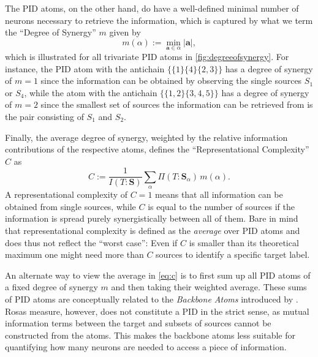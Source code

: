 \documentclass[10pt]{article}
\renewcommand\autoref[1]{\cref{#1}}
\theoremstyle{definition}
\theoremstyle{plain}
\begin{document}
The PID atoms, on the other hand, do have a well-defined minimal number of neurons necessary to retrieve the information, which is captured by what we term the ``Degree of Synergy'' $m$ given by
\begin{equation}
\label{eq:m}
    m(\alpha) := \min_{\bm a \in \alpha} |\bm a|,
\end{equation}
which is illustrated for all trivariate PID atoms in \autoref{fig:degreeofsynergy}.
For instance, the PID atom with the antichain $\{\{1\}\{4\}\{2, 3\}\}$ has a degree of synergy of $m=1$ since the information can be obtained by observing the single sources $S_1$ or $S_4$, while the atom with the antichain $\{\{1, 2\}\{3, 4, 5\}\}$ has a degree of synergy of $m=2$ since the smallest set of sources the information can be retrieved from is the pair consisting of $S_1$ and $S_2$.

Finally, the average degree of synergy, weighted by the relative information contributions of the respective atoms, defines the ``Representational Complexity'' $C$ as
\begin{equation}
    C := \frac{1}{I(T:\bm S)} \sum_\alpha \Pi(T:\bm{S}_\alpha) \, m(\alpha)
    \label{eq:c}.
\end{equation}
A representational complexity of $C=1$ means that all information can be obtained from single sources, while $C$ is equal to the number of sources if the information is spread purely synergistically between all of them. Bare in mind that representational complexity is defined as the \emph{average} over PID atoms and does thus not reflect the ``worst case'': Even if $C$ is smaller than its theoretical maximum one might need more than $C$ sources to identify a specific target label.

An alternate way to view the average in \autoref{eq:c} is to first sum up all PID atoms of a fixed degree of synergy $m$ and then taking their weighted average. These sums of PID atoms are conceptually related to the \textit{Backbone Atoms} introduced by \cite{rosas_operational_2020}. Rosas measure, however, does not constitute a PID in the strict sense, as mutual information terms between the target and subsets of sources cannot be constructed from the atoms. This makes the backbone atoms less suitable for quantifying how many neurons are needed to access a piece of information.
\end{document}
